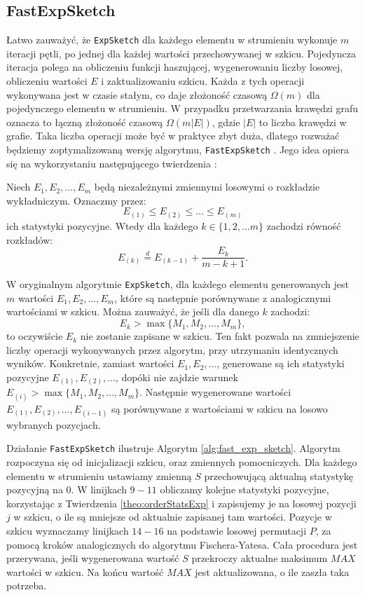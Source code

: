 \subsection{FastExpSketch}
    Łatwo zauważyć, że \texttt{ExpSketch} dla każdego elementu w strumieniu wykonuje $m$ iteracji pętli, po jednej dla każdej wartości przechowywanej w szkicu. Pojedyncza iteracja polega na obliczeniu funkcji haszującej, wygenerowaniu liczby losowej, obliczeniu wartości $E$ i zaktualizowaniu szkicu. Każda z tych operacji wykonywana jest w czasie stałym, co daje złożoność czasową $\Omega(m)$ dla pojedynczego elementu w strumieniu. W przypadku przetwarzania krawędzi grafu oznacza to łączną złożoność czasową $\Omega(m|E|)$, gdzie $|E|$ to liczba krawędzi w grafie. Taka liczba operacji może być w praktyce zbyt duża, dlatego rozważać będziemy zoptymalizowaną wersję algorytmu, \texttt{FastExpSketch} \cite{Lemiesz_2023}. Jego idea opiera się na wykorzystaniu następującego twierdzenia \cite{Devroye_1986a}:
    \begin{twierdzenie}
        \label{theo:orderStatsExp}        
        Niech $E_1, E_2, \dots, E_m$ będą niezależnymi zmiennymi losowymi o rozkładzie wykładniczym. Oznaczmy przez:
        \[
            E_{(1)} \leq E_{(2)} \leq \dots \leq E_{(m)}  
        \]
        ich statystyki pozycyjne. Wtedy dla każdego $k \in \{1,2, \dots m\}$ zachodzi równość rozkładów: 
        \[
            E_{(k)} \stackrel{d}{=} E_{(k - 1)} + \frac{E_k}{m - k + 1}.       
        \]
    \end{twierdzenie}

    W oryginalnym algorytmie \texttt{ExpSketch}, dla każdego elementu generowanych jest $m$ wartości $E_{1}, E_{2}, \dots, E_{m}$, które są następnie porównywane z analogicznymi wartościami w szkicu. Można zauważyć, że jeśli dla danego $k$ zachodzi:
    \[
        E_{k} > \max{\{M_1, M_2, \dots, M_m\}},     
    \]
    to oczywiście $E_{k}$ nie zostanie zapisane w szkicu. Ten fakt pozwala na zmniejszenie liczby operacji wykonywanych przez algorytm, przy utrzymaniu identycznych wyników. Konkretnie, zamiast wartości $E_{1}, E_{2}, \dots$, generowane są ich statystyki pozycyjne $E_{(1)}, E_{(2)}, \dots$, dopóki nie zajdzie warunek $E_{(i)} > \max{\{M_1, M_2, \dots, M_m\}}$. Następnie wygenerowane wartości $E_{(1)}, E_{(2)}, \dots, E_{(i - 1)}$ są porównywane z wartościami w szkicu na losowo wybranych pozycjach. 
    
    Działanie \texttt{FastExpSketch} ilustruje Algorytm \ref{alg:fast_exp_sketch}. Algorytm rozpoczyna się od inicjalizacji szkicu, oraz zmiennych pomocniczych. Dla każdego elementu w strumieniu ustawiamy zmienną $S$ przechowującą aktualną statystykę pozycyjną na $0$. W linijkach $9-11$ obliczamy kolejne statystyki pozycyjne, korzystając z Twierdzenia \ref{theo:orderStatsExp} i zapisujemy je na losowej pozycji $j$ w szkicu, o ile są mniejsze od aktualnie zapisanej tam wartości. Pozycje w  szkicu wyznaczamy linijkach $14-16$ na podstawie losowej permutacji $P$, za pomocą kroków analogicznych do algorytmu Fischera-Yatesa. Cała procedura jest przerywana, jeśli wygenerowana wartość $S$ przekroczy aktualne maksimum $MAX$ wartości w szkicu. Na końcu wartość $MAX$ jest aktualizowana, o ile zaszła taka potrzeba.

